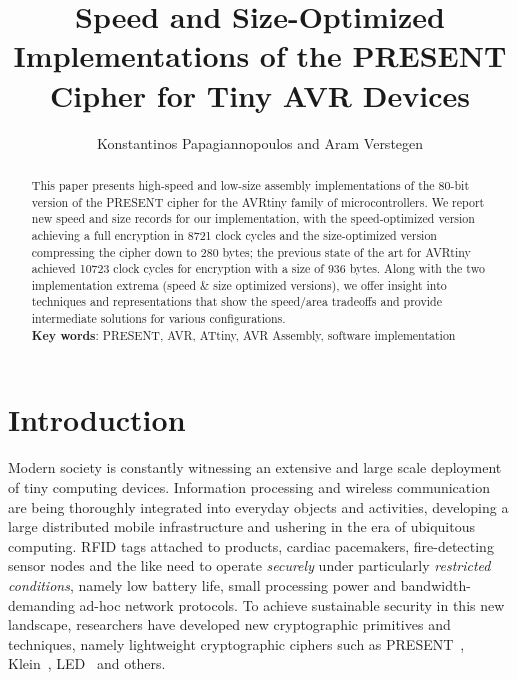 \documentclass[11pt]{llncs2e} %
\begin{document}
\title{Speed and Size-Optimized Implementations of the PRESENT Cipher for Tiny AVR Devices}

\author{Konstantinos Papagiannopoulos and Aram Verstegen}
\maketitle

\begin{abstract}
This paper presents high-speed and low-size assembly implementations of the 80-bit version of the PRESENT cipher for the AVRtiny family of microcontrollers. We report new speed and size records for our implementation, with the speed-optimized version achieving a full encryption in 8721 clock cycles and the size-optimized version compressing the cipher down to 280 bytes; the previous state of the art for AVRtiny achieved 10723 clock cycles for encryption with a size of 936 bytes. Along with the two implementation extrema (speed \& size optimized versions), we offer insight into techniques and representations that show the speed/area tradeoffs and provide intermediate solutions for various configurations.\\
\textbf{Key words}: PRESENT, AVR, ATtiny, AVR Assembly, software implementation
\end{abstract}
\section{Introduction}
Modern society is constantly witnessing an extensive and large scale deployment of tiny computing devices. Information processing and wireless communication are being thoroughly integrated into everyday objects and activities, developing a large distributed mobile infrastructure and ushering in the era of ubiquitous computing. RFID tags attached to products, cardiac pacemakers, fire-detecting sensor nodes and the like need to operate \emph{securely} under particularly \emph{restricted conditions}, namely low battery life, small processing power and bandwidth-demanding ad-hoc network protocols. To achieve sustainable security in this new landscape, researchers have developed new cryptographic primitives and techniques, namely lightweight cryptographic ciphers such as PRESENT~\cite{bogdanov2007present}, Klein~\cite{gong2012klein}, LED~\cite{guo2011led} and others.
\end{document}
